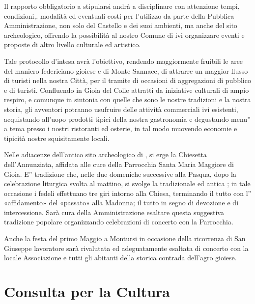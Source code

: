 \documentclass[a4paper,14pt,italian]{sphinxmanual}
\begin{document}
Il rapporto obbligatorio a stipularsi andrà a disciplinare con attenzione tempi, condizioni,. modalità ed eventuali costi per l’utilizzo da parte della Pubblica Amministrazione, non solo del Castello e dei suoi ambienti, ma anche del sito archeologico, offrendo la possibilità al nostro Comune di ivi organizzare eventi e proposte di altro livello culturale ed artistico.

Tale protocollo d’intesa avrà l’obiettivo, rendendo maggiormente fruibili le aree del maniero federiciano gioiese e di Monte Sannace, di attrarre un maggior flusso di turisti nella nostra Città, per il tramite di occasioni di aggregazioni di pubblico e di turisti. Confluendo in Gioia del Colle attratti da iniziative culturali di ampio respiro, e comunque in sintonia con quelle che sono le nostre tradizioni e la nostra storia, gli avventori potranno usufruire delle attività commerciali ivi esistenti, acquistando all’uopo prodotti tipici della nostra gastronomia e degustando menu” a tema presso i nostri ristoranti ed osterie, in tal modo muovendo economie e tipicità nostre squisitamente locali.

Nelle adiacenze dell’antico sito archeologico di , si erge la Chiesetta dell’Annunziata, affidata alle cure della Parrocchia Santa Maria Maggiore di Gioia.
E” tradizione che, nelle due domeniche successive alla Pasqua, dopo la celebrazione liturgica svolta al mattino, si svolge la tradizionale ed antica ; in tale occasione i fedeli effettuano tre giri intorno alla Chiesa, terminando il tutto con l” «affidamento» del «passato» alla Madonna; il tutto in segno di devozione e di intercessione. Sarà cura della Amministrazione esaltare questa suggestiva tradizione popolare organizzando celebrazioni di concerto con la Parrocchia.

Anche la festa del primo Maggio a Montursi in occasione della ricorrenza di San Giuseppe lavoratore sarà rivalutata ed adeguatamente esaltata di concerto con la locale Associazione e tutti gli abitanti della storica contrada dell’agro gioiese.


\section{Consulta per la Cultura}
\label{\detokenize{cultura:consulta-per-la-cultura}}
\end{document}
